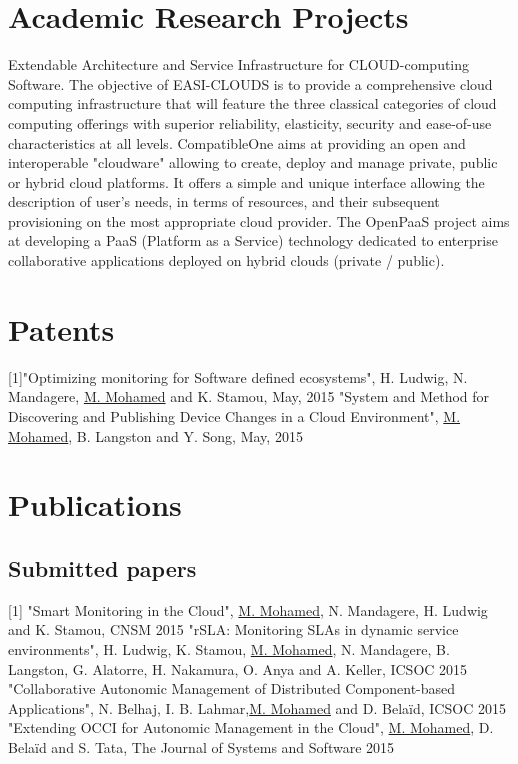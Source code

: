 \documentclass[11pt,a4paper,sans]{moderncv}   %
\begin{document}
\section{Academic Research Projects}
 {Extendable Architecture and Service Infrastructure for CLOUD-computing Software. The objective of EASI-CLOUDS is to provide a 
comprehensive cloud computing infrastructure that will feature the three classical categories of cloud computing offerings with superior reliability, elasticity, security and 
ease-of-use characteristics at all levels.}
 {CompatibleOne aims at providing an open and interoperable "cloudware" allowing to create, deploy 
and manage private, public or hybrid cloud platforms. It offers a simple and unique interface allowing the description of user's needs, in terms of 
resources, and their subsequent provisioning on the most appropriate cloud provider.}
 {The OpenPaaS project aims at developing a PaaS (Platform as a Service) technology dedicated to 
enterprise collaborative applications deployed on hybrid clouds (private / public).}
\section{Patents}
[1]"Optimizing monitoring for Software defined ecosystems", H. Ludwig, N. Mandagere, \underline{M. Mohamed} and K. Stamou, May, 2015 \newline
[2] "System and Method for Discovering and Publishing Device Changes in a Cloud Environment", \underline{M. Mohamed}, B. Langston and Y. Song, May, 2015
\section{Publications}
\subsection{Submitted papers}
[1] "Smart Monitoring in the Cloud", \underline{M. Mohamed}, N. Mandagere, H. Ludwig and K. Stamou, CNSM 2015 \newline
[2] "rSLA: Monitoring SLAs in dynamic service environments", H. Ludwig, K. Stamou, \underline{M. Mohamed}, N. Mandagere, B. Langston, 
G. Alatorre, H. Nakamura, O. Anya and A. Keller, ICSOC 2015 \newline
[3] "Collaborative Autonomic Management of Distributed Component-based Applications", N. Belhaj, I. B. Lahmar,\underline{M. Mohamed} and D. Bela\"id,  ICSOC 
2015 \newline
[4] "Extending OCCI for Autonomic Management in the Cloud", \underline{M. Mohamed}, D. Bela\"id and S. Tata, The Journal of Systems and Software 2015
\end{document}

